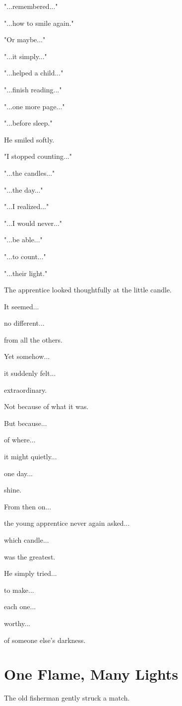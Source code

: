 \documentclass[12pt,openany]{book}
\begin{document}
"...remembered..."

"...how to smile again."

"Or maybe..."

"...it simply..."

"...helped a child..."

"...finish reading..."

"...one more page..."

"...before sleep."

He smiled softly.

"I stopped counting..."

"...the candles..."

"...the day..."

"...I realized..."

"...I would never..."

"...be able..."

"...to count..."

"...their light."

The apprentice looked thoughtfully at the little candle.

It seemed...

no different...

from all the others.

Yet somehow...

it suddenly felt...

extraordinary.

Not because of what it was.

But because...

of where...

it might quietly...

one day...

shine.

From then on...

the young apprentice never again asked...

which candle...

was the greatest.

He simply tried...

to make...

each one...

worthy...

of someone else's darkness.
\section*{One Flame, Many Lights}

The old fisherman gently struck a match.
\end{document}
